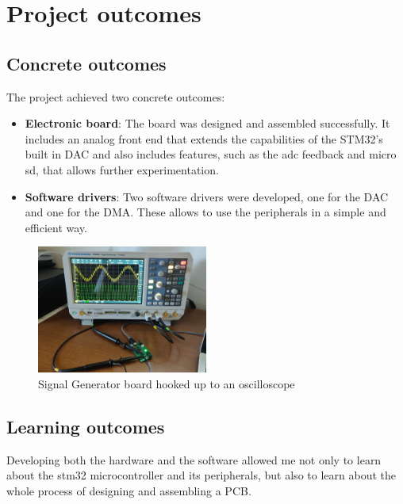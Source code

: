 \section{Project outcomes}

\subsection{Concrete outcomes}

The project achieved two concrete outcomes:
\begin{itemize}
      \item \textbf{Electronic board}: The board was designed and assembled successfully. It includes an analog front end that extends the capabilities of the STM32's built in DAC and also includes features, such as the adc feedback and micro sd, that allows further experimentation.
      \item \textbf{Software drivers}: Two software drivers were developed, one for the DAC and one for the DMA. These allows to use the peripherals in a simple and efficient way.
\end{itemize}

\begin{figure}[h]
      \captionsetup[figure]{labelformat=empty}
      \centering
      \includegraphics[width=0.5\textwidth]{graphics/device_with_oscilloscope.jpg}
      \caption{Signal Generator board hooked up to an oscilloscope}
\end{figure}

\subsection{Learning outcomes}

Developing both the hardware and the software allowed me not only to learn about the stm32 microcontroller and its peripherals, but also to learn about the whole process of designing and assembling a PCB.

\bigbreak

